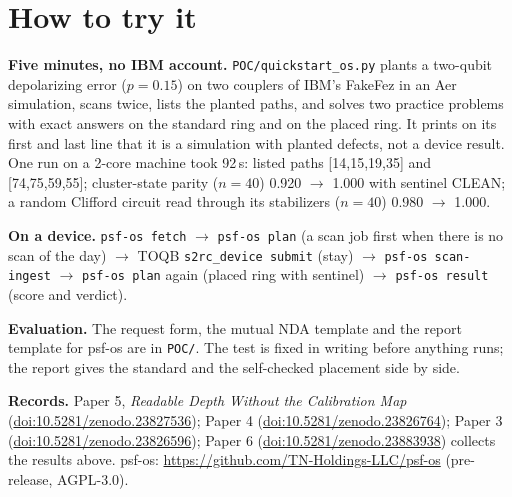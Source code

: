 \documentclass[10pt,a4paper]{article}
\begin{document}
\section{How to try it}

\textbf{Five minutes, no IBM account.} \texttt{POC/quickstart\_os.py} plants a two-qubit depolarizing error
($p=0.15$) on two couplers of IBM's FakeFez in an Aer simulation, scans twice, lists the planted paths, and solves two
practice problems with exact answers on the standard ring and on the placed ring. It prints on its first and last line
that it is a simulation with planted defects, not a device result. One run on a 2-core machine took 92\,s: listed
paths [14,15,19,35] and [74,75,59,55]; cluster-state parity ($n=40$) 0.920 $\to$ 1.000 with sentinel CLEAN; a random
Clifford circuit read through its stabilizers ($n=40$) 0.980 $\to$ 1.000.

\textbf{On a device.} \texttt{psf-os fetch} $\to$ \texttt{psf-os plan} (a scan job first when there is no scan of the
day) $\to$ TOQB \texttt{s2rc\_device submit} (stay) $\to$ \texttt{psf-os scan-ingest} $\to$ \texttt{psf-os plan}
again (placed ring with sentinel) $\to$ \texttt{psf-os result} (score and verdict).

\textbf{Evaluation.} The request form, the mutual NDA template and the report template for psf-os are in
\texttt{POC/}. The test is fixed in writing before anything runs; the report gives the standard and the self-checked
placement side by side.

\textbf{Records.} Paper 5, \emph{Readable Depth Without the Calibration Map}
(\href{https://doi.org/10.5281/zenodo.23827536}{doi:10.5281/zenodo.23827536}); Paper 4
(\href{https://doi.org/10.5281/zenodo.23826764}{doi:10.5281/zenodo.23826764}); Paper 3
(\href{https://doi.org/10.5281/zenodo.23826596}{doi:10.5281/zenodo.23826596}); Paper 6
(\href{https://doi.org/10.5281/zenodo.23883938}{doi:10.5281/zenodo.23883938}) collects the results above. psf-os: \url{https://github.com/TN-Holdings-LLC/psf-os} (pre-release, AGPL-3.0).
\end{document}
